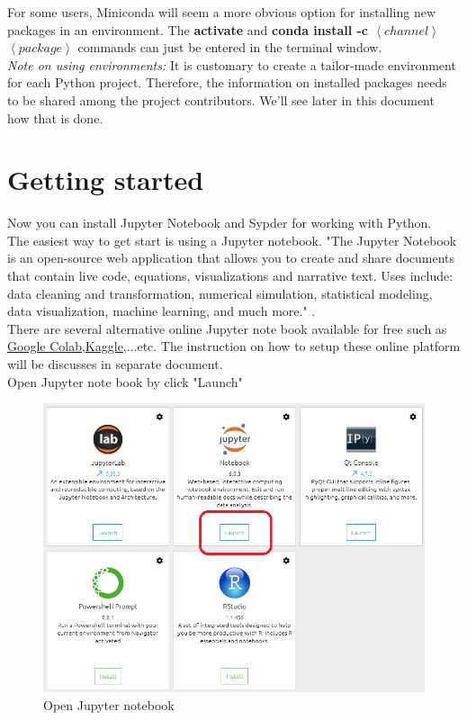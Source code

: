 \documentclass[a4paper,10pt]{article}
\begin{document}
For some users, Miniconda will seem a more obvious option for installing new packages in an environment. The \textbf{activate} and \textbf{conda install -c $\left<channel\right>$ 
	$\left<package\right>$} commands can just be entered in the terminal window.\\

\textit{Note on using environments:}
It is customary to create a tailor-made environment for each Python project. Therefore, the information on installed packages needs to be shared among the project contributors. We'll see later in this document how that is done.


\medskip


\section{Getting started}
\label{sec:start}

Now you can install Jupyter Notebook and Sypder for working with Python.\\
The easiest way to get start is using a Jupyter notebook.
"The Jupyter Notebook is an open-source web application that allows you to create and share documents that contain live code, equations, visualizations and narrative text. Uses include: data cleaning and transformation, numerical simulation, statistical modeling, data visualization, machine learning, and much more." \cite{Jupyternotebook}.\\
There are several alternative online Jupyter note book available for free such as \href{https://colab.research.google.com/notebooks/welcome.ipynb}{Google Colab},\href{https://www.kaggle.com/}{Kaggle},...etc. The instruction on how to setup these online platform will be discusses in separate document.\\
Open Jupyter note book by click "Launch"

\begin{figure}[H]
\centering\includegraphics[width=1\columnwidth]{Pictures/Jupyter.png}
\caption[Short title]{Open Jupyter notebook}
\label{fig:ff7}\end{figure}
\end{document}
